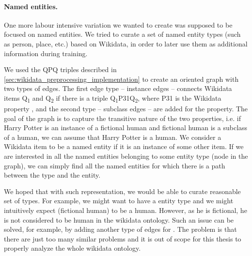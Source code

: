 \paragraph{Named entities.}

One more labour intensive variation we wanted to create was supposed to be focused on named entities. We tried to curate a set of named entity types (such as person, place, etc.) based on Wikidata, in order to later use them as additional information during training. 

We used the QPQ triples described in \autoref{sec:wikidata_preprocessing_implementation} to create an oriented graph with two types of edges. The first edge type -- instance edges -- connects Wikidata items Q\textsubscript{1} and Q\textsubscript{2} if there is a triple Q\textsubscript{1}P31Q\textsubscript{2}, where P31 is the Wikidata property , and the second type -- subclass edges -- are added for the  property. The goal of the graph is to capture the transitive nature of the two properties, i.e. if Harry Potter is an instance of a fictional human and fictional human is a subclass of a human, we can assume that Harry Potter is a human. We consider a Wikidata item to be a named entity if it is an instance of some other item. If we are interested in all the named entities belonging to some entity type (node in the graph), we can simply find all the named entities for which there is a path between the type and the entity.

We hoped that with such representation, we would be able to curate reasonable set of types. For example, we might want to have a  entity type and we might intuitively expect  (fictional human) to be a human. However, as he is fictional, he is not considered to be human in the wikidata ontology. Such an issue can be solved, for example, by adding another type of edges for . The problem is that there are just too many similar problems and it is out of scope for this thesis to properly analyze the whole wikidata ontology. 


